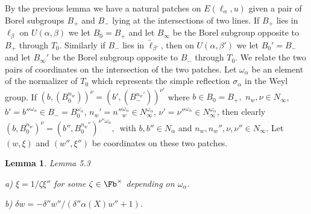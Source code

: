 \documentclass{memo-l}
\newtheorem{lemma}[theorem]{Lemma}
\theoremstyle{definition}
\theoremstyle{remark}
\numberwithin{section}{chapter}
\numberwithin{equation}{chapter}
\begin{document}
{\medskip}

   By the previous lemma we have a natural patches on
$E({\ell}_{{\alpha}},u)$ given a pair of Borel subgroups $B_{+}$ and
$B_{-}$ lying at the intersections of two lines.  If $B_{+}$ lies in
${\ell}_{{\beta}}$ on $U({\alpha},{\beta})$ we let $B_{0} = B_{+}$ and let
$B_{{\infty}}$ be the Borel subgroup opposite to $B_{+}$ through $T_{0}$.
Similarly if $B_{-}$ lies in $\tilde{\ell} _{{\beta}'}$, then on
$U({\alpha},{\beta}')$ we let $B_{0}' = B_{-}$ and let $B_{{\infty}}'$ be
the Borel subgroup opposite to $B_{-}$ through $T_{0}$.  We relate the two
pairs of coordinates on the intersection of the two patches.  Let
${\omega}_{\alpha}$ be an element of the normalizer of $T_{0}$ which
represents the simple reflection ${\sigma}_{{\alpha}}$ in the Weyl group.
If $(b,(B_{0}^{n_w}))^{\nu} = (b',(B_{-}^{n_{w}'}))^{\nu'}$ where 
$b  \in  B_{0} = B_{+},$ $n_{w},{\nu}  \in 
N_{{\infty}}$, 
%
%
$b' = {b''}^{{\omega}_{{\alpha}}}  \in  B_{-} = 
		B_{0}^{{\omega}_{{\alpha}}}$, 
%
$n_{w}' = {n''}_{w}^{{\omega}_{{\alpha}}}  \in 
		N_{{\infty}}^{{\omega}_{{\alpha}}}$, 
%
${\nu}' = {\nu''}^{{\omega}_{{\alpha}}} 
 \in  N_{{\infty}}^{{\omega}_{{\alpha}}}$,
%
%
then clearly $(b,B_{0}^{n_{w}})^{{\nu}} = 
(b'',B_{0}^{n_{w}''})^{{\nu}''{\omega_{{\alpha}}}},$\ with $b,b''  \in 
N_{{\alpha}}$ and $n_{w},n_{w}'',{\nu},{\nu}''  \in  N_{{\infty}}$.  Let
$(w,{\xi})$ and $(w'',{\xi}'')$ be coordinates on these two patches.

\medpagebreak

\begin{lemma}{Lemma 5.3}
		    
\noindent
a) ${\xi} = 1/{\zeta}{\xi}''$ for some ${\zeta}  \in  \Fb^{\times}$ depending
on ${\omega}_{\alpha}$.

\noindent        
b) ${\delta}w = -{\delta}''w''/({\delta}''{\alpha}(X)w''+1)$.
\end{lemma}

\medpagebreak
\end{document}
